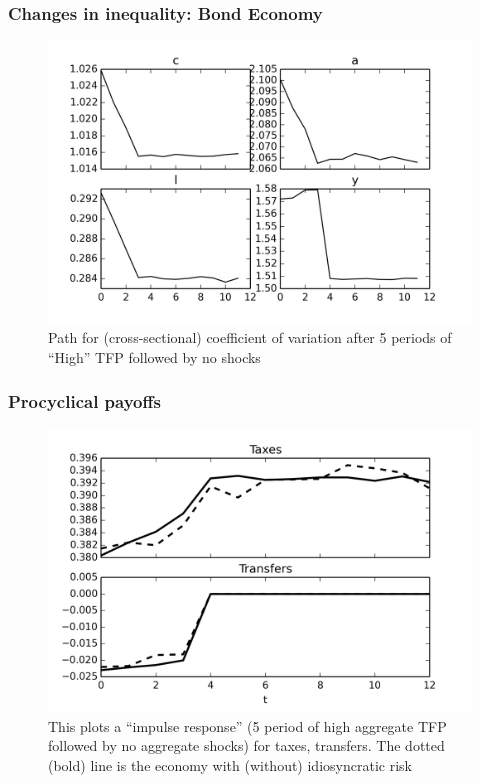 \documentclass{beamer}
\begin{document}
 
\begin{frame}
 \frametitle{Changes in inequality: Bond Economy}
\begin{figure}[htp]
\includegraphics[width=\textwidth]{coeff_variation_bond_economy.png}
\caption{\tiny{Path for (cross-sectional) coefficient of variation after 5 periods of ``High'' TFP followed by no shocks}}
\label{fig:}
\end{figure}


 \end{frame}
 
 
\begin{frame}
 \frametitle{Procyclical payoffs}

\begin{figure}[htp]
\includegraphics[width=\textwidth]{policy_irf_high_plot_data_procyclic_payoffs.png}
\caption{\tiny{This plots a ``impulse response'' (5 period of high aggregate TFP followed by no aggregate shocks) for taxes, transfers. The dotted (bold) line is the economy with (without) idiosyncratic risk}}
\label{fig:}
\end{figure}
 \end{frame}
\end{document}
